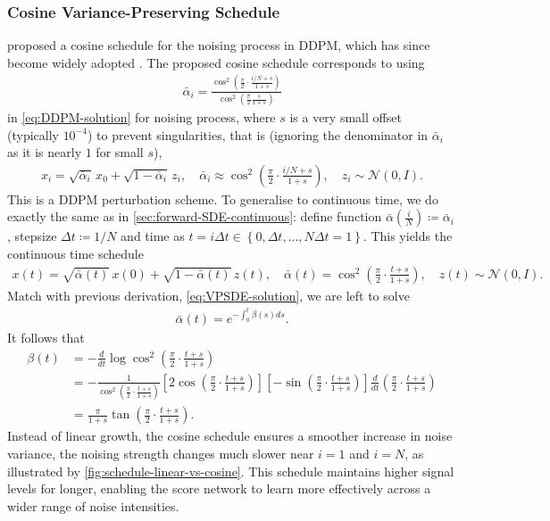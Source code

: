 \documentclass[a4paper,12pt]{article}
\begin{document}
\subsubsection{Cosine Variance-Preserving Schedule}\label{sec:Cos-schedule}
\citet{nicholImprovedDenoisingDiffusion2021} proposed a cosine schedule for the noising process in DDPM, which has since become widely adopted \citep{dhariwal2021DiffusionModelsBeat,saharia2022PhotorealisticTexttoImageDiffusion,watsonNovoDesignProtein2023}. The proposed cosine schedule corresponds to using
\begin{align*}
    \bar \alpha_i = \frac{\cos^2\!\left(\frac{\pi}{2}\cdot\frac{i/N+s}{1+s}\right)}{\cos^2\!\left(\frac{\pi}{2}\frac{s}{1+s}\right)}
\end{align*}
in \cref{eq:DDPM-solution} for noising process, where \(s\) is a very small offset (typically \(10^{-4}\)) to prevent singularities, that is (ignoring the denominator in \(\bar{\alpha}_i\) as it is nearly \(1\) for small \(s\)),
\begin{align*}
    x_i=\sqrt{\bar\alpha_i}\,x_0+\sqrt{1-\bar\alpha_i}\,z_i,\quad\bar\alpha_i\approx\cos^2\!\left(\frac{\pi}{2}\cdot\frac{i/N+s}{1+s}\right),\quad z_i\sim\mathcal{N}\!\left(0, I\right).
\end{align*}
This is a DDPM perturbation scheme. To generalise to continuous time, we do exactly the same as in \cref{sec:forward-SDE-continuous}: define function \(\bar{\alpha}\!\left(\frac{i}{N}\right)\coloneq\bar\alpha_i\), stepsize \(\Delta t\coloneq 1/N\) and time as \(t=i\Delta t\in\left\{0,\Delta t,...,N\Delta t=1\right\}\). This yields the continuous time schedule
\begin{align*}
    x\!\left(t\right)=\sqrt{\bar\alpha\!\left(t\right)}\,x\!\left(0\right)+\sqrt{1-\bar\alpha\!\left(t\right)}\,z\!\left(t\right),\quad\bar\alpha\!\left(t\right)=\cos^2\left(\frac{\pi}{2}\cdot\frac{t+s}{1+s}\right),\quad z\!\left(t\right)\sim\mathcal{N}\!\left(0, I\right).
\end{align*}
Match with previous derivation, \cref{eq:VPSDE-solution}, we are left to solve
\begin{align*}
    \bar\alpha\!\left(t\right)=e^{-\int_0^t\beta(s)ds}.
\end{align*}
It follows that
\begin{align}
    \nonumber
    \beta(t)
    &=-\frac{d}{dt}\log\cos^2\left(\frac{\pi}{2}\cdot\frac{t+s}{1+s}\right)\\
    \nonumber
    &=-\frac{1}{\cos^2\left(\frac{\pi}{2}\cdot\frac{t+s}{1+s}\right)}\left[2\cos\left(\frac{\pi}{2}\cdot\frac{t+s}{1+s}\right)\right]\left[-\sin\left(\frac{\pi}{2}\cdot\frac{t+s}{1+s}\right)\right]\frac{d}{dt}\left(\frac{\pi}{2}\cdot\frac{t+s}{1+s}\right)\\
    \label{eq:cosine-beta}
    &=\frac{\pi}{1+s}\tan\left(\frac{\pi}{2}\cdot\frac{t+s}{1+s}\right).
\end{align}
Instead of linear growth, the cosine schedule ensures a smoother increase in noise variance, the noising strength changes much slower near \(i=1\) and \(i=N\), as illustrated by \cref{fig:schedule-linear-vs-cosine}. This schedule maintains higher signal levels for longer, enabling the score network to learn more effectively across a wider range of noise intensities.
\end{document}
